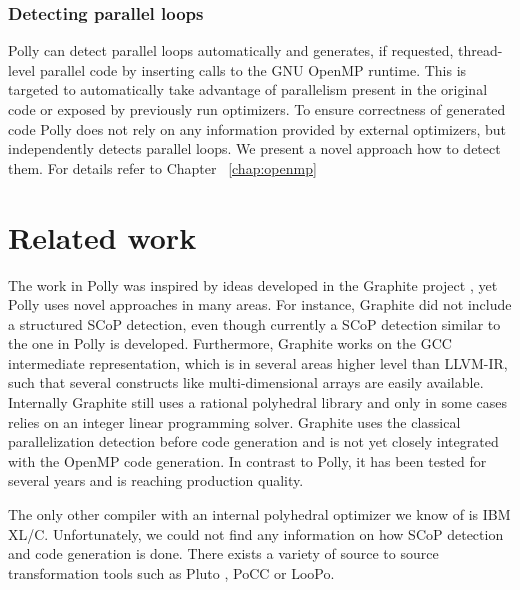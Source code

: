 \subsubsection{Detecting parallel loops}
Polly can detect parallel loops automatically and generates, if requested,
thread-level parallel code by inserting calls to the GNU OpenMP runtime. This
is targeted to automatically take advantage of parallelism present in the
original code or exposed by previously run optimizers. To ensure correctness of
generated code Polly does not rely on any information provided by external
optimizers, but independently detects parallel loops. We present a novel
approach how to detect them. For details refer to Chapter ~\ref{chap:openmp}


\section{Related work}

The work in Polly was inspired by ideas developed in the Graphite project \cite{TRIFUNOVIC:2010},
yet Polly uses novel approaches in many areas. For instance, Graphite did not
include a structured SCoP detection, even though currently a SCoP detection
similar to the one in Polly is developed.  Furthermore, Graphite works on the
GCC intermediate representation, which is in several areas higher level than
LLVM-IR, such that several constructs like multi-dimensional arrays are easily
available.  Internally Graphite still uses a rational polyhedral library and
only in some cases relies on an integer linear programming solver.
Graphite uses the classical parallelization detection before code generation and is
not yet closely integrated with the OpenMP code generation. In contrast
to Polly, it has been tested for several years and is reaching production quality.

The only other compiler with an internal polyhedral optimizer we know of is 
IBM XL/C. Unfortunately, we could not find any information on how SCoP detection
and code generation is done.
There exists a variety of source to source transformation tools
such as Pluto \cite{pluto}, PoCC or LooPo.

